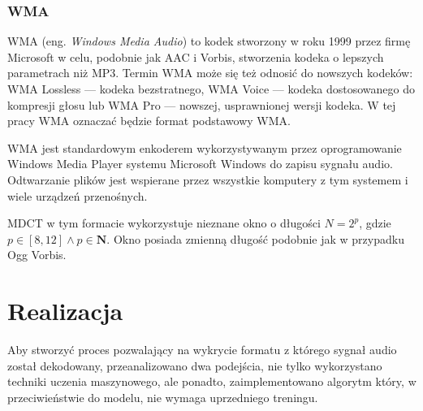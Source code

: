 \documentclass[pl,12pt]{aghdpl}
\let\Oldchapter\chapter%
\renewcommand{\chapter}{\FloatBarrier\Oldchapter}
\let\Oldsubsection\subsection%
\renewcommand{\subsection}{\FloatBarrier\Oldsubsection}
\begin{document}
\subsection{WMA}

WMA (eng. \textit{Windows Media Audio}) to kodek stworzony w roku 1999 przez
firmę Microsoft w celu, podobnie jak AAC i Vorbis, stworzenia kodeka o lepszych
parametrach niż MP3. Termin WMA może się też odnosić do nowszych kodeków: WMA
Lossless --- kodeka bezstratnego, WMA Voice --- kodeka dostosowanego do
kompresji głosu lub WMA Pro --- nowszej, usprawnionej wersji kodeka. W tej
pracy WMA oznaczać będzie format podstawowy WMA.

WMA jest standardowym enkoderem wykorzystywanym przez oprogramowanie Windows
Media Player systemu Microsoft Windows do zapisu sygnału audio. Odtwarzanie
plików jest wspierane przez wszystkie komputery z tym systemem i wiele urządzeń
przenośnych.

MDCT w tym formacie wykorzystuje nieznane okno o długości $N = 2^p$, gdzie $p
\in [8,12] \land p \in\bm N$. Okno posiada zmienną długość podobnie jak w
przypadku Ogg Vorbis.

\chapter{Realizacja}
Aby stworzyć proces pozwalający na wykrycie formatu z którego sygnał audio
został dekodowany, przeanalizowano dwa podejścia, nie tylko wykorzystano
techniki uczenia maszynowego, ale ponadto, zaimplementowano algorytm który, w
przeciwieństwie do modelu, nie wymaga uprzedniego treningu.
\end{document}
